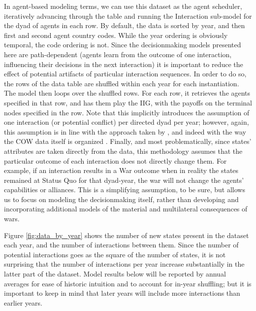 In agent-based modeling terms, we can use this dataset as the agent scheduler, iteratively advancing through the table and running the Interaction sub-model for the dyad of agents in each row. By default, the data is sorted by year, and then first and second agent country codes. While the year ordering is obviously temporal, the code ordering is not. Since the decisionmaking models presented here are path-dependent (agents learn from the outcome of one interaction, influencing their decisions in the next interaction) it is important to reduce the effect of potential artifacts of particular interaction sequences. In order to do so, the rows of the data table are shuffled within each year for each instantiation. The model then loops over the shuffled rows. For each row, it retrieves the agents specified in that row, and has them play the IIG, with the payoffs on the terminal nodes specified in the row. Note that this implicitly introduces the assumption of one interaction (or potential conflict) per directed dyad per year; however, again, this assumption is in line with the approach taken by \citet{bennett_2000}, and indeed with the way the COW data itself is organized \citep{palmer_2015}. Finally, and most problematically, since states' attributes are taken directly from the data, this methodology assumes that the particular outcome of each interaction does not directly change them. For example, if an interaction results in a War outcome when in reality the states remained at Status Quo for that dyad-year, the war will not change the agents' capabilities or alliances. This is a simplifying assumption, to be sure, but allows us to focus on modeling the decisionmaking itself, rather than developing and incorporating additional models of the material and multilateral consequences of wars.

Figure \ref{fig:data_by_year} shows the number of new states present in the dataset each year, and the number of interactions between them. Since the number of potential interactions goes as the square of the number of states, it is not surprising that the number of interactions per year increase substantially in the latter part of the dataset. Model results below will be reported by annual averages for ease of historic intuition and to account for in-year shuffling; but it is important to keep in mind that later years will include more interactions than earlier years.

